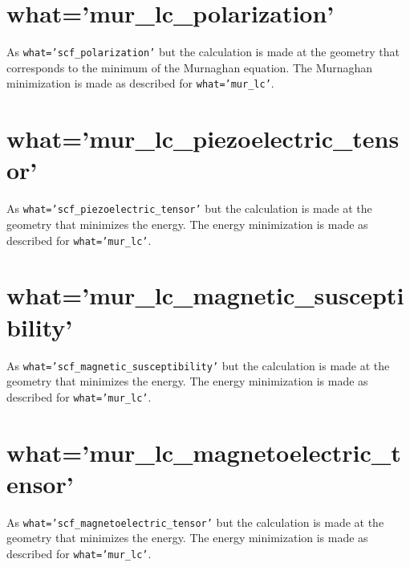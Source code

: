 \documentclass[12pt,a4paper,twoside]{report}
\begin{document}
\newpage
{\color{coral}\section{what='mur\_lc\_polarization'}}
\color{black}
As \texttt{what='scf\_polarization'} but the calculation is made at the
geometry that corresponds to the minimum of the Murnaghan equation. The
Murnaghan minimization is made as described for \texttt{what='mur\_lc'}.\\

\newpage
{\color{coral}\section{what='mur\_lc\_piezoelectric\_tensor'}}
\color{black}
As \texttt{what='scf\_piezoelectric\_tensor'} but the calculation 
is made at the
geometry that minimizes the energy. The
energy minimization is made as described for \texttt{what='mur\_lc'}. \\

{\color{coral}\section{what='mur\_lc\_magnetic\_susceptibility'}}
\color{black}
As \texttt{what='scf\_magnetic\_susceptibility'} but the calculation 
is made at the
geometry that minimizes the energy. The
energy minimization is made as described for \texttt{what='mur\_lc'}. \\

{\color{coral}\section{what='mur\_lc\_magnetoelectric\_tensor'}}
\color{black}
As \texttt{what='scf\_magnetoelectric\_tensor'} but the calculation
is made at the
geometry that minimizes the energy. The
energy minimization is made as described for \texttt{what='mur\_lc'}. \\
\end{document}
